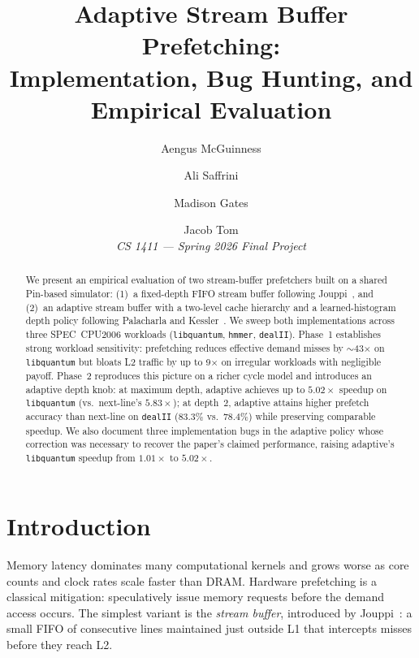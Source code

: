 \documentclass[11pt,letterpaper]{article}
\title{\textbf{Adaptive Stream Buffer Prefetching:\\
Implementation, Bug Hunting, and Empirical Evaluation}}
\author{Aengus McGuinness \and Ali Saffrini \and Madison Gates \and Jacob Tom\\[0.5em]
\textit{CS 1411 --- Spring 2026 Final Project}}
\date{}
\begin{document}
\maketitle

\begin{abstract}
We present an empirical evaluation of two stream-buffer prefetchers built on a
shared Pin-based simulator: (1)~a fixed-depth FIFO stream buffer following
Jouppi~\cite{jouppi1990improving}, and (2)~an adaptive stream buffer with a
two-level cache hierarchy and a learned-histogram depth policy following
Palacharla and Kessler~\cite{palacharla1994evaluating}. We sweep both
implementations across three SPEC~CPU2006 workloads
(\texttt{libquantum}, \texttt{hmmer}, \texttt{dealII}). Phase~1 establishes
strong workload sensitivity: prefetching reduces effective demand misses by
$\sim$43$\times$ on \texttt{libquantum} but bloats L2 traffic by up to
9$\times$ on irregular workloads with negligible payoff. Phase~2 reproduces
this picture on a richer cycle model and introduces an adaptive depth knob:
at maximum depth, adaptive achieves up to $5.02\times$ speedup on
\texttt{libquantum} (vs.\ next-line's $5.83\times$); at depth~$2$, adaptive
attains higher prefetch accuracy than next-line on \texttt{dealII}
($83.3\%$ vs.\ $78.4\%$) while preserving comparable speedup. We also document
three implementation bugs in the adaptive policy whose correction was
necessary to recover the paper's claimed performance, raising adaptive's
\texttt{libquantum} speedup from $1.01\times$ to $5.02\times$.
\end{abstract}

\section{Introduction}
Memory latency dominates many computational kernels and grows worse as core
counts and clock rates scale faster than DRAM. Hardware prefetching is a
classical mitigation: speculatively issue memory requests before the demand
access occurs. The simplest variant is the \emph{stream buffer}, introduced by
Jouppi~\cite{jouppi1990improving}: a small FIFO of consecutive lines maintained
just outside L1 that intercepts misses before they reach L2.
\end{document}
